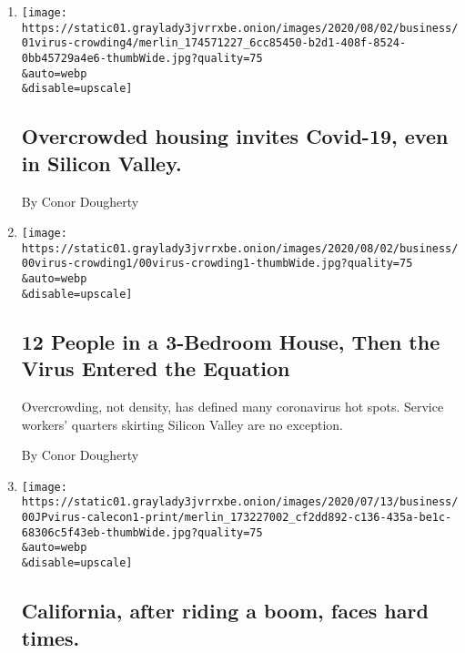 \begin{enumerate}
\def\labelenumi{\arabic{enumi}.}
\item
  \href{/live/2020/08/03/business/stock-market-today-coronavirus/overcrowded-housing-invites-covid-19-even-in-silicon-valley}{}

  \texttt{[image: https://static01.graylady3jvrrxbe.onion/images/2020/08/02/business/01virus-crowding4/merlin\_174571227\_6cc85450-b2d1-408f-8524-0bb45729a4e6-thumbWide.jpg?quality=75\\\&auto=webp\\\&disable=upscale]}

  \hypertarget{overcrowded-housing-invites-covid-19-even-in-silicon-valley}{%
  \subsection{Overcrowded housing invites Covid-19, even in Silicon
  Valley.}\label{overcrowded-housing-invites-covid-19-even-in-silicon-valley}}

  By Conor Dougherty
\item
  \href{/2020/08/01/business/economy/housing-overcrowding-coronavirus.html}{}

  \texttt{[image: https://static01.graylady3jvrrxbe.onion/images/2020/08/02/business/00virus-crowding1/00virus-crowding1-thumbWide.jpg?quality=75\\\&auto=webp\\\&disable=upscale]}

  \hypertarget{12-people-in-a-3-bedroom-house-then-the-virus-entered-the-equation}{%
  \subsection{12 People in a 3-Bedroom House, Then the Virus Entered the
  Equation}\label{12-people-in-a-3-bedroom-house-then-the-virus-entered-the-equation}}

  Overcrowding, not density, has defined many coronavirus hot spots.
  Service workers' quarters skirting Silicon Valley are no exception.

  By Conor Dougherty
\item
  \href{/live/2020/07/10/business/stock-market-today-coronavirus/california-after-riding-a-boom-faces-hard-times}{}

  \texttt{[image: https://static01.graylady3jvrrxbe.onion/images/2020/07/13/business/00JPvirus-calecon1-print/merlin\_173227002\_cf2dd892-c136-435a-be1c-68306c5f43eb-thumbWide.jpg?quality=75\\\&auto=webp\\\&disable=upscale]}

  \hypertarget{california-after-riding-a-boom-faces-hard-times}{%
  \subsection{California, after riding a boom, faces hard
  times.}\label{california-after-riding-a-boom-faces-hard-times}}


\end{enumerate}
